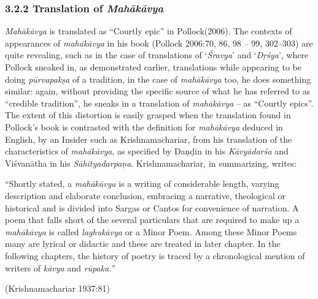 \vskip -18pt


\subsubsection*{3.2.2 Translation of \textit{Mahākāvya}}

\vskip -5pt

\textit{Mahākāvya} is translated as “Courtly epic” in Pollock(2006). The contexts of appearances of \textit{mahākāvya} in his book (Pollock 2006:70, 86, 98 – 99, 302–303) are quite revealing, such as in the case of translations of ‘\textit{Śravya}’ and ‘\textit{Dṛśya}’, where Pollock sneaked in, as demonstrated earlier, translations while appearing to be doing \textit{pūrvapakṣa} of a tradition, in the case of \textit{mahākāvya} too, he does something similar: again, without providing the specific source of what he has referred to as “credible tradition”, he sneaks in a translation of \textit{mahākāvya} – as “Courtly epics”. The extent of this distortion is easily grasped when the translation found in Pollock’s book is contrasted with the definition for \textit{mahākāvya} deduced in English, by an Insider such as Krishnamachariar, from his translation of the characteristics of \textit{mahākāvya}, as specified by Daṇḍin in his \textit{Kāvyādarśa} and Viśvanātha in his \textit{Sāhityadarpaṇa}. Krishnamachariar, in summarizing, writes:

\begin{myquote}
“Shortly stated, a \textit{mahākāvya} is a writing of considerable length, varying description and elaborate conclusion, embracing a narrative, theological or historical and is divided into Sargas or Cantos for convenience of narration. A poem that falls short of the several particulars that are required to make up a \textit{mahākāvya} is called \textit{laghukāvya} or a Minor Poem. Among these Minor Poems many are lyrical or didactic and these are treated in later chapter. In the following chapters, the history of poetry is traced by a chronological mention of writers of \textit{kāvya} and \textit{rūpaka.}”
\end{myquote}

\hfill (Krishnamachariar 1937:81)

